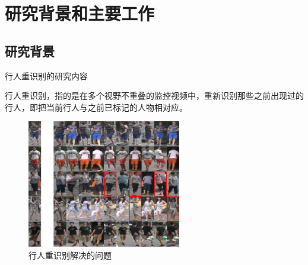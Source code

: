 \section{研究背景和主要工作}

\subsection{研究背景}

\begin{frame}{行人重识别的研究内容}
\begin{block}{}
    行人重识别，指的是在多个视野不重叠的监控视频中，重新识别那些之前出现过的行人，即把当前行人与之前已标记的人物相对应。
\end{block}
\begin{figure}
    \centering
    \includegraphics[width=0.6\textwidth,trim={0 200 0 0},clip=true]{figures/vis3}
    \caption{行人重识别解决的问题}
    \label{fig:reid_intro}
\end{figure}
\end{frame}



